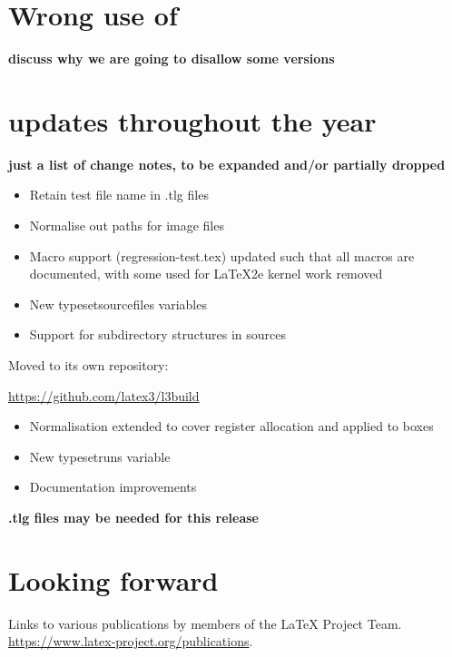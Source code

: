 \documentclass{ltnews}
\begin{document}
\section{Wrong use of }

\textbf{discuss why we are going to disallow some versions}



\section{ updates throughout the year}

\textbf{just a list of change notes, to be expanded and/or partially dropped}

\begin{itemize}
\item Retain test file name in .tlg files
\item Normalise out paths for image files
\item Macro support (regression-test.tex) updated such that
  all macros are documented, with some used for LaTeX2e kernel
  work removed
\item New typesetsourcefiles variables
\item Support for subdirectory structures in sources
\end{itemize}

Moved  to its own repository:

\url{https://github.com/latex3/l3build}

\begin{itemize}
\item Normalisation extended to cover
  register allocation and
   applied to boxes
\item New typesetruns variable
\item Documentation improvements
\end{itemize}


\textbf{.tlg files may be needed for this release}

\section{}

\section{}





\section{Looking forward}


\begin{thebibliography}{10}
  \raggedright
    Links to various publications by members of the \LaTeX{} Project Team.
    \newblock \url{https://www.latex-project.org/publications}.
\end{thebibliography}
\end{document}
